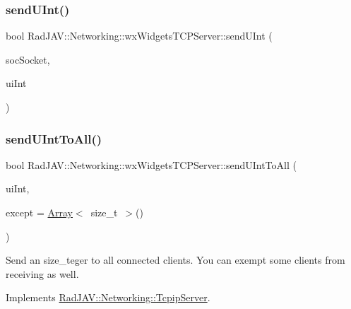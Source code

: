 \subsubsection{\texorpdfstring{send\+U\+Int()}{sendUInt()}}
{\footnotesize\ttfamily bool Rad\+J\+A\+V\+::\+Networking\+::wx\+Widgets\+T\+C\+P\+Server\+::send\+U\+Int (\begin{DoxyParamCaption}\item[{wx\+Socket\+Base $\ast$}]{soc\+Socket,  }\item[{size\+\_\+t}]{ui\+Int }\end{DoxyParamCaption})}

\mbox{\label{class_rad_j_a_v_1_1_networking_1_1wx_widgets_t_c_p_server_ae5f1eb128e2895da1cc1f1015e08dfb4}} 
\subsubsection{\texorpdfstring{send\+U\+Int\+To\+All()}{sendUIntToAll()}}
{\footnotesize\ttfamily bool Rad\+J\+A\+V\+::\+Networking\+::wx\+Widgets\+T\+C\+P\+Server\+::send\+U\+Int\+To\+All (\begin{DoxyParamCaption}\item[{size\+\_\+t}]{ui\+Int,  }\item[{\mbox{\hyperlink{class_rad_j_a_v_1_1_array}{Array}}$<$ size\+\_\+t $>$}]{except = {\ttfamily \mbox{\hyperlink{class_rad_j_a_v_1_1_array}{Array}}$<$~size\+\_\+t~$>$()} }\end{DoxyParamCaption})\hspace{0.3cm}{\ttfamily [virtual]}}

Send an size\+\_\+teger to all connected clients. You can exempt some clients from receiving as well. 

Implements \mbox{\hyperlink{class_rad_j_a_v_1_1_networking_1_1_tcpip_server_ab6768866944867f365b7a006f897838a}{Rad\+J\+A\+V\+::\+Networking\+::\+Tcpip\+Server}}.

\mbox{\label{class_rad_j_a_v_1_1_networking_1_1wx_widgets_t_c_p_server_a45d4749373218af45168ac52b9cb7881}} 
